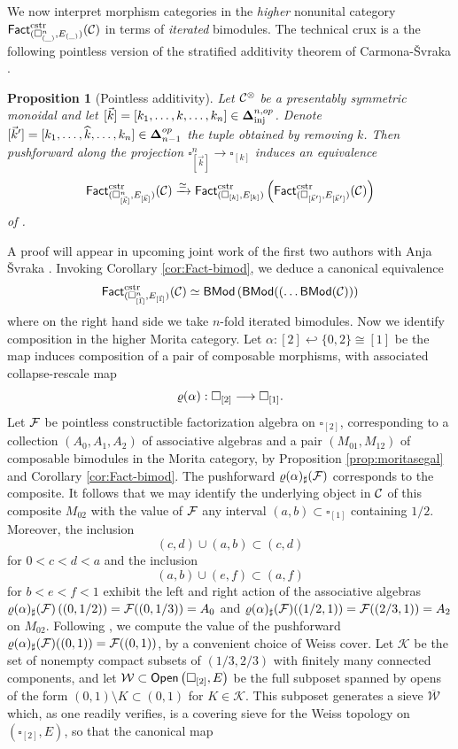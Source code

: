\documentclass[10pt, reqno, twoside
, final
]{amsart}
\numberwithin{equation}{subsection}%
\theoremstyle{definition}
\theoremstyle{definition}
\theoremstyle{definition}
\theoremstyle{definition}
\theoremstyle{definition}
\theoremstyle{definition}
\theoremstyle{definition}
\theoremstyle{definition}
\theoremstyle{definition}
\theoremstyle{plain}
\theoremstyle{definition}
\theoremstyle{plain}
\theoremstyle{definition}
\theoremstyle{plain}
\theoremstyle{definition}
\theoremstyle{definition}
\theoremstyle{plain}
\theoremstyle{plain}
\theoremstyle{definition}
\theoremstyle{plain}
\theoremstyle{plain}
\newtheorem{prop}[defn]{Proposition}
\theoremstyle{plain}
\begin{document}
We now interpret morphism categories in the \emph{higher} nonunital category $\mathsf{Fact}^{\mathrm{cstr}}_{(\square^n_{(\_)},E_{(\_)}) }(\mathcal{C})$ in terms of \emph{iterated} bimodules. The technical crux is a the following pointless version of the stratified additivity theorem of Carmona-\v{S}vraka \cite[Theorem A]{Carmona-Svraka}. 
\begin{prop}[Pointless additivity]\label{prop:markedadditivity}
Let $\mathcal{C}^{\otimes}$ be a presentably symmetric monoidal \infcat and let $[\vec{k}]=[k_1,\ldots,k,\ldots,k_n]\in \boldsymbol{\Delta}^{n,op}_{\mathrm{inj}}$. Denote $[\vec{k}']=[k_1,\ldots,\widehat{k},\ldots,k_n] \in \boldsymbol{\Delta}^{op}_{n-1}$ the tuple obtained by removing $k$. Then pushforward along the projection $\square^{n}_{[\vec{k}]}\rightarrow \square_{[k]}$ induces an equivalence
    \[  \mathsf{Fact}^{\mathrm{cstr}}_{(\square^n_{[\vec{k}]},E_{[\vec{k}]})}(\mathcal{C}) \xrightarrow{\simeq} \mathsf{Fact}^{\mathrm{cstr}}_{(\square_{[k]},E_{[k]})}\left(\mathsf{Fact}^{\mathrm{cstr}}_{(\square_{[\vec{k}']},E_{[\vec{k}']})}(\mathcal{C})\right) \]
of \infcatst.
\end{prop}
A proof will appear in upcoming joint work of the first two authors with Anja \v{S}vraka \cite{ScStSv}. Invoking Corollary \ref{cor:Fact-bimod}, we deduce a canonical equivalence 
\[  \mathsf{Fact}^{\mathrm{cstr}}_{(\square^n_{[\vec{1}]},E_{[\vec{1}]})}(\mathcal{C}) \simeq \mathsf{BMod}\left(\mathsf{BMod}((\ldots\mathsf{BMod}(\mathcal{C}))\right)  \]
where on the right hand side we take $n$-fold iterated bimodules. Now we identify composition in the higher Morita category. Let $\alpha:[2]\hookleftarrow \{0,2\}\cong [1]$ be the map induces composition of a pair of composable morphisms, with associated collapse-rescale map 
\[  \varrho(\alpha): \square_{[2]} \longrightarrow \square_{[1]}. \]
Let $\mathcal{F}$ be pointless constructible factorization algebra on $\square_{[2]}$, corresponding to a collection $(A_0,A_1,A_2)$ of associative algebras and a pair $(M_{01},M_{12})$ of composable bimodules in the Morita category, by Proposition \ref{prop:moritasegal} and Corollary \ref{cor:Fact-bimod}. The pushforward $\varrho(\alpha)_{\sharp}(\mathcal{F})$ corresponds to the composite. It follows that we may identify the underlying object in $\mathcal{C}$ of this composite $M_{02}$ with the value of $\mathcal{F}$ any interval $(a,b)\subset \square_{[1]}$ containing $1/2$. Moreover, the inclusion 
\[(c,d)\cup (a,b)\subset (c,d)\]
for $0<c<d<a$ and the inclusion 
\[(a,b)\cup (e,f)\subset (a,f)\] 
for $b<e<f<1$ exhibit the left and right action of the associative algebras $\varrho(\alpha)_{\sharp}(\mathcal{F})\left((0,1/2)\right)=\mathcal{F}((0,1/3))=A_{0}$ and $\varrho(\alpha)_{\sharp}(\mathcal{F})((1/2,1))=\mathcal{F}((2/3,1))=A_2$ on $M_{02}$. Following \cite[Example 6.14]{KSW}, we compute the value of the pushforward $\varrho(\alpha)_{\sharp}(\mathcal{F})((0,1))=\mathcal{F}((0,1))$, by a convenient choice of Weiss cover. Let $\mathcal{K}$ be the set of nonempty compact subsets of $(1/3,2/3)$ with finitely many connected components, and let $\mathcal{W}\subset \mathsf{Open}\left(\square_{[2]},E\right)$ be the full subposet spanned by opens of the form $(0,1)\setminus K\subset (0,1)$ for ${K\in \mathcal{K}}$. This subposet generates a sieve $\overline{\mathcal{W}}$ which, as one readily verifies, is a covering sieve for the Weiss topology on $(\square_{[2]},E)$, so that the canonical map
\end{document}
